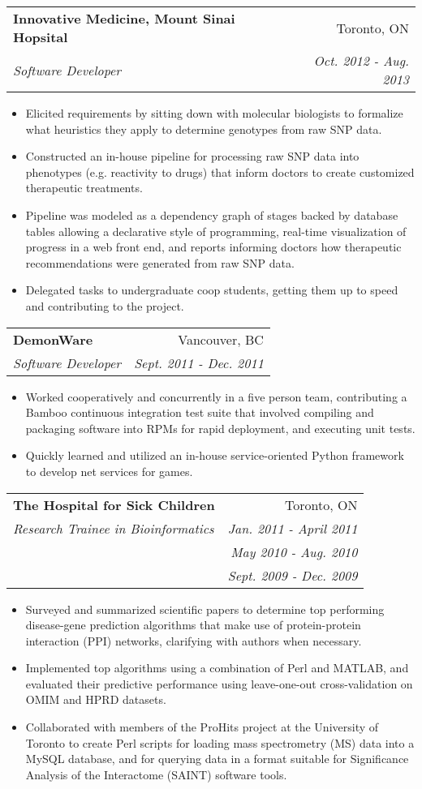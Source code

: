 \documentclass[letterpaper,11pt]{article}
\makeatletter
\newcommand{\company}[1]{
    \textbf{#1}
}
\newcommand{\resitem}[1]{\item #1 \vspace{-2pt}}
\newcommand{\ressubheading}[4]{
\begin{tabular*}{6.5in}{l@{\extracolsep{\fill}}r}
    
		\company{#1} & #2 \\
		\textit{#3} & \textit{#4} \\
\end{tabular*}\vspace{-6pt}}
\newcommand{\sickkids}[6]{
\begin{tabular*}{6.5in}{l@{\extracolsep{\fill}}r}
		\company{#1} & #2 \\
		\textit{#3} & \textit{#4} \\
		 & \textit{#5} \\
		 & \textit{#6} \\
\end{tabular*}\vspace{-6pt}}
\makeatother
\begin{document}
\begin{itemize}
	\ressubheading{Innovative Medicine, Mount Sinai Hopsital}{Toronto, ON}{Software Developer}{Oct. 2012 - Aug. 2013}
	\begin{itemize}
		\resitem{
            Elicited requirements by sitting down with molecular biologists to formalize 
            what heuristics they apply to determine genotypes from raw SNP data.
        }
		\resitem{
            Constructed an in-house pipeline for processing raw SNP data into phenotypes 
            (e.g. reactivity to drugs) that inform doctors to create customized therapeutic 
            treatments.  
        }
        \resitem{
            Pipeline was modeled as a dependency graph of stages backed by database 
            tables allowing a declarative style of programming, real-time 
            visualization of progress in a web front end, and reports informing 
            doctors how therapeutic recommendations were generated from raw SNP data.
        }
        \resitem{
            Delegated tasks to undergraduate coop students, getting them up to speed and 
            contributing to the project.
        }
	\end{itemize}

	\ressubheading{DemonWare}{Vancouver, BC}{Software Developer}{Sept. 2011 - Dec. 2011}
	\begin{itemize}
		\resitem{
            Worked cooperatively and concurrently in a five person team, contributing a 
            Bamboo continuous integration test suite that involved compiling and packaging 
            software into RPMs for rapid deployment, and executing unit tests.
        }
        \resitem{
            Quickly learned and utilized an in-house service-oriented Python framework to 
            develop net services for games.
        }
	\end{itemize}

	\sickkids{The Hospital for Sick Children}{Toronto, ON}{Research Trainee in 
    Bioinformatics}{Jan. 2011 - April 2011}{May 2010 - Aug. 2010}{Sept. 2009 - Dec. 2009}
	\begin{itemize}
		\resitem{
             Surveyed and summarized scientific papers to determine top performing 
             disease-gene prediction algorithms that make use of protein-protein interaction 
             (PPI) networks, clarifying with authors when necessary.
        }
        \resitem{
             Implemented top algorithms using a combination of Perl and MATLAB, and 
             evaluated their predictive performance using leave-one-out cross-validation on 
             OMIM and HPRD datasets.
        }
        \resitem{
             Collaborated with members of the ProHits project at the University of Toronto 
             to create Perl scripts for loading mass spectrometry (MS) data into a MySQL 
             database, and for querying data in a format suitable for Significance Analysis 
             of the Interactome (SAINT) software tools.
        }
	\end{itemize}

\end{itemize}
\end{document}
